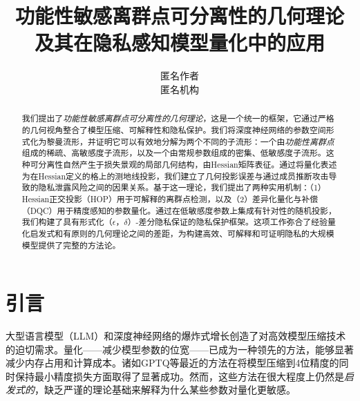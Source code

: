 \documentclass[letterpaper,twocolumn,10pt]{article}
\begin{document}

\date{}

\title{\Large \bf 功能性敏感离群点可分离性的几何理论\\及其在隐私感知模型量化中的应用}

\author{
{\rm 匿名作者}\\
匿名机构
}

\maketitle

\begin{abstract}
我们提出了\emph{功能性敏感离群点可分离性的几何理论}，这是一个统一的框架，它通过严格的几何视角整合了模型压缩、可解释性和隐私保护。我们将深度神经网络的参数空间形式化为黎曼流形，并证明它可以有效地分解为两个不同的子流形：一个由\emph{功能性离群点}组成的稀疏、高敏感度子流形，以及一个由常规参数组成的密集、低敏感度子流形。这种可分离性自然产生于损失景观的局部几何结构，由Hessian矩阵表征。通过将量化表述为在Hessian定义的格上的测地线投影，我们建立了几何投影误差与通过成员推断攻击导致的隐私泄露风险之间的因果关系。基于这一理论，我们提出了两种实用机制：（1）Hessian正交投影（HOP）用于可解释的离群点检测，以及（2）差异化量化与补偿（DQC）用于精度感知的参数量化。通过在低敏感度参数上集成有针对性的随机投影，我们构建了具有形式化$（\epsilon，\delta）$-差分隐私保证的隐私保护框架。这项工作弥合了经验量化启发式和有原则的几何理论之间的差距，为构建高效、可解释和可证明隐私的大规模模型提供了完整的方法论。
\end{abstract}

\section{引言}

大型语言模型（LLM）和深度神经网络的爆炸式增长创造了对高效模型压缩技术的迫切需求。量化——减少模型参数的位宽——已成为一种领先的方法，能够显著减少内存占用和计算成本\cite{deng2020model}。诸如GPTQ\cite{frantar2022gptq}等最近的方法在将模型压缩到4位精度的同时保持最小精度损失方面取得了显著成功。然而，这些方法在很大程度上仍然是\emph{启发式的}，缺乏严谨的理论基础来解释为什么某些参数对量化更敏感。
\end{document}
